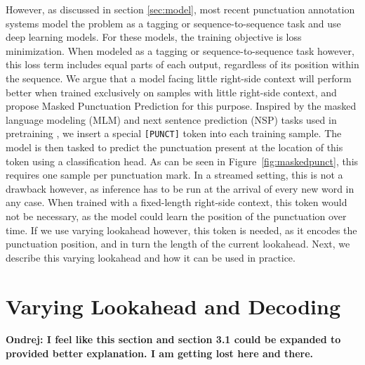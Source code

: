 \documentclass[bsc,deptreport,ai]{infthesis} %
\newcommand{\Ondrej}[1]{{\color{red} \textbf{Ondrej: #1}}}
\begin{document}
However, as discussed in section \ref{sec:model}, most recent punctuation annotation systems model the problem as a tagging or sequence-to-sequence task and use deep learning models. For these models, the training objective is loss minimization. When modeled as a tagging or sequence-to-sequence task however, this loss term includes equal parts of each output, regardless of its position within the sequence. We argue that a model facing little right-side context will perform better when trained exclusively on samples with little right-side context, and propose Masked Punctuation Prediction for this purpose. Inspired by the masked language modeling (MLM) and next sentence prediction (NSP) tasks used in pretraining \citep{roberta}, we insert a special \texttt{[PUNCT]} token into each training sample. The model is then tasked to predict the punctuation present at the location of this token using a classification head. As can be seen in Figure~\ref{fig:maskedpunct}, this requires one sample per punctuation mark. In a streamed setting, this is not a drawback however, as inference has to be run at the arrival of every new word in any case. When trained with a fixed-length right-side context, this token would not be necessary, as the model could learn the position of the punctuation over time. If we use varying lookahead however, this token is needed, as it encodes the punctuation position, and in turn the length of the current lookahead. Next, we describe this varying lookahead and how it can be used in practice.

\section{Varying Lookahead and Decoding}
\label{sec:entropyalgo}
\Ondrej{I feel like this section and section 3.1 could be expanded to provided better explanation. I am getting lost here and there.}
\end{document}
